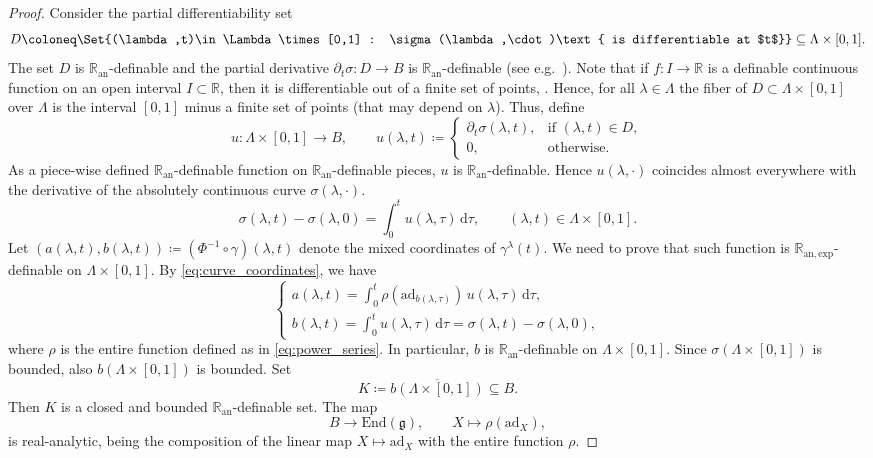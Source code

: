 \documentclass[a4paper,11pt,reqno]{amsart}
\theoremstyle{plain}
\theoremstyle{definition}
\newcommand{\R}{\mathbb R}
\newcommand{\Ran}{\mathbb R_{\mathrm{an}}}
\newcommand{\Ranexp}{\mathbb R_{\mathrm{an,exp}}}
\newcommand{\g}{\mathfrak{g}}
\newcommand{\de}{\mathrm{d}}
\newcommand{\End}{\mathrm{End}}
\newcommand{\ad}{\mathrm{ad}}
\begin{document}
\begin{proof}
Consider the partial differentiability set
\begin{equation*}
    D \coloneq \Set{(\lambda,t)\in \Lambda\times [0,1] : \sigma(\lambda,\cdot)\text{ is differentiable at $t$}}\subseteq \Lambda\times [0,1].
\end{equation*}
The set $D$ is $\Ran$-definable and the partial derivative $\partial_t\sigma :D\to B$ is $\Ran$-definable (see e.g.\ \cite[Lemma 6.8]{Coste}). Note that if $f:I\to \R$ is a definable continuous function on an open interval $I\subset \R$, then it is differentiable out of a finite set of points, \cite[Cor.\ 6.5]{Coste}. Hence, for all $\lambda\in  \Lambda$ the fiber of $D\subset \Lambda\times[0,1]$ over $\Lambda$ is the interval $[0,1]$ minus a finite set of points (that may depend on $\lambda$). Thus, define
\begin{equation}
    u : \Lambda \times [0,1] \to B, \qquad u(\lambda,t)\coloneq 
        \begin{cases}
\partial_t\sigma(\lambda,t), & \text{if }(\lambda,t)\in D,\\
0, & \text{otherwise}.
    \end{cases}
\end{equation}
As a piece-wise defined $\Ran$-definable function on $\Ran$-definable pieces, $u$ is $\Ran$-definable. Hence \(u(\lambda,\cdot)\) coincides almost everywhere with the derivative of
the absolutely continuous curve \(\sigma(\lambda,\cdot)\).
\[
\sigma(\lambda,t)-\sigma(\lambda,0)
=
\int_0^t u(\lambda,\tau)\,\de \tau,
\qquad
(\lambda,t)\in \Lambda \times[0,1].
\]
    Let $(a(\lambda,t),b(\lambda,t))\coloneq (\Phi^{-1}\circ\gamma)(\lambda,t)$ denote the mixed coordinates of $\gamma^\lambda(t)$. We need to prove that such function is $\Ranexp$-definable on $\Lambda\times [0,1]$. By \eqref{eq:curve_coordinates}, we have
    \[
    \begin{cases}
    a(\lambda,t)=\displaystyle\int_0^t \rho(\ad_{b(\lambda,\tau)})\,u(\lambda,\tau)\,\de \tau,\\[0.8em]
    b(\lambda,t)=\displaystyle\int_0^t u(\lambda,\tau)\,\de \tau
    =\sigma(\lambda,t)-\sigma(\lambda,0),
    \end{cases}
    \]
    where $\rho$ is the entire function defined as in \eqref{eq:power_series}. In particular, $b$ is $\Ran$-definable on $\Lambda\times[0,1]$. Since $\sigma(\Lambda\times[0,1])$ is bounded, also $b(\Lambda\times[0,1])$ is bounded. Set
    \[
    K\coloneq \overline{b( \Lambda\times[0,1])}\subseteq B.
    \]
    Then $K$ is a closed and bounded $\Ran$-definable set. The map
    \[
    B\to \End(\g),\qquad X\mapsto \rho(\ad_X),
    \]
    is real-analytic, being the composition of the linear map $X \mapsto \ad_X$ with the entire function $\rho$.
    

\end{proof}
\end{document}
